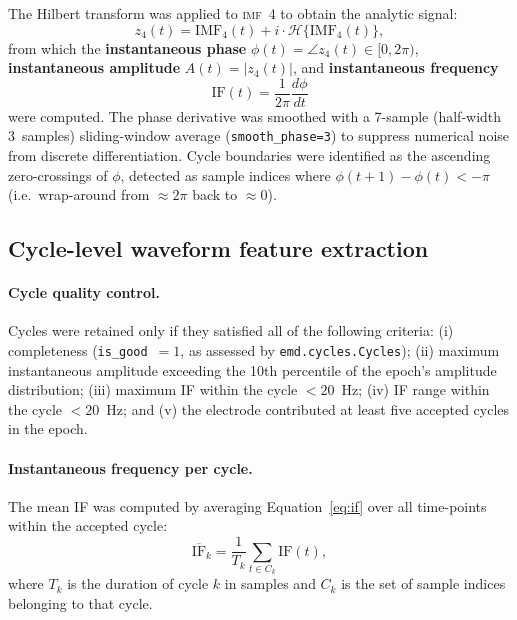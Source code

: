 \documentclass[11pt, a4paper]{article}
\newcommand{\imf}{\textsc{imf}}
\begin{document}
The Hilbert transform was applied to \imf{}~4 to obtain the analytic
signal:
%
\begin{equation}
  z_4(t) = \text{IMF}_4(t) + i \cdot \mathcal{H}\{\text{IMF}_4(t)\},
\end{equation}
%
from which the \textbf{instantaneous phase} $\phi(t) = \angle z_4(t) \in [0, 2\pi)$,
\textbf{instantaneous amplitude} $A(t) = |z_4(t)|$, and
\textbf{instantaneous frequency}
%
\begin{equation}
  \text{IF}(t) = \frac{1}{2\pi} \frac{d\phi}{dt}
  \label{eq:if}
\end{equation}
%
were computed. The phase derivative was smoothed with a 7-sample (half-width
3~samples) sliding-window average (\texttt{smooth\_phase=3}) to suppress
numerical noise from discrete differentiation.
Cycle boundaries were identified as the ascending zero-crossings of $\phi$,
detected as sample indices where $\phi(t+1) - \phi(t) < -\pi$ (i.e.\
wrap-around from $\approx 2\pi$ back to $\approx 0$).

\subsection{Cycle-level waveform feature extraction}

\paragraph{Cycle quality control.}
Cycles were retained only if they satisfied all of the following criteria:
(i) completeness (\texttt{is\_good}~$= 1$, as assessed by
\texttt{emd.cycles.Cycles}); (ii) maximum instantaneous amplitude exceeding
the 10th percentile of the epoch's amplitude distribution; (iii) maximum IF
within the cycle $< 20$~Hz; (iv) IF range within the cycle $< 20$~Hz; and
(v) the electrode contributed at least five accepted cycles in the epoch.

\paragraph{Instantaneous frequency per cycle.}
The mean IF was computed by averaging Equation~\ref{eq:if} over all
time-points within the accepted cycle:
%
\begin{equation}
  \overline{\text{IF}}_k = \frac{1}{T_k} \sum_{t \in C_k} \text{IF}(t),
\end{equation}
%
where $T_k$ is the duration of cycle $k$ in samples and $C_k$ is the
set of sample indices belonging to that cycle.
\end{document}
